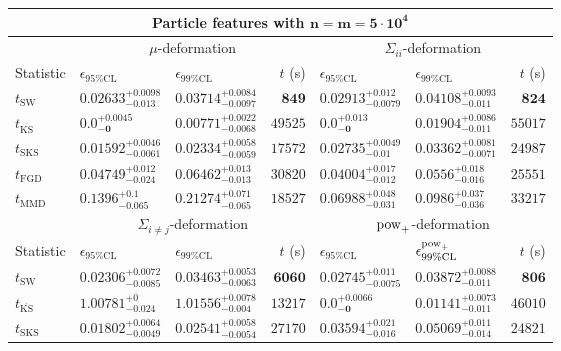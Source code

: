 \begin{tabular}{l|llr|llr}
	\toprule
	\multicolumn{7}{c}{{\bf Particle features with $\mathbf{n=m=5\cdot 10^{4}}$}} \\
	\toprule
	\multicolumn{1}{c}{} & \multicolumn{3}{c}{$\mu$-deformation} & \multicolumn{3}{c}{$\Sigma_{ii}$-deformation} \\
	Statistic & $\epsilon_{95\%\mathrm{CL}}$ & $\epsilon_{99\%\mathrm    {CL}}$ & $t$ (s) & $\epsilon_{95\%\mathrm{CL}}$ & $\epsilon_{99\%\mathrm{CL}}$ & $t$ (s) \\
	\midrule
	$t_{\mathrm{SW}}$ & $0.02633_{-0.013}^{+0.0098}$ & $0.03714_{-0.0097}^{+0.0084}$ & ${\mathbf{849}}$ & $0.02913_{-0.0079}^{+0.012}$ & $0.04108_{-0.011}^{+0.0093}$ & ${\mathbf{824}}$ \\
	$t_{\overline{\mathrm{KS}}}$ & ${\mathbf{0.0_{-0}^{+0.0045}}}$ & ${\mathbf{0.00771_{-0.0068}^{+0.0022}}}$ & $49525$ & ${\mathbf{0.0_{-0}^{+0.013}}}$ & ${\mathbf{0.01904_{-0.011}^{+0.0086}}}$ & $55017$ \\
	$t_{\mathrm{SKS}}$ & $0.01592_{-0.0061}^{+0.0046}$ & $0.02334_{-0.0059}^{+0.0058}$ & $17572$ & $0.02735_{-0.01}^{+0.0049}$ & $0.03362_{-0.0071}^{+0.0081}$ & $24987$ \\
	$t_{\mathrm{FGD}}$ & $0.04749_{-0.024}^{+0.012}$ & $0.06462_{-0.013}^{+0.013}$ & $30820$ & $0.04004_{-0.012}^{+0.017}$ & $0.0556_{-0.016}^{+0.018}$ & $25551$ \\
	$t_{\mathrm{MMD}}$ & $0.1396_{-0.065}^{+0.1}$ & $0.21274_{-0.065}^{+0.071}$ & $18527$ & $0.06988_{-0.031}^{+0.048}$ & $0.0986_{-0.036}^{+0.037}$ & $33217$ \\
	\toprule
	\multicolumn{1}{c}{} & \multicolumn{3}{c}{$\Sigma_{i\neq j}$-deformation} & \multicolumn{3}{c}{$\rm{pow}_{+}$-deformation} \\
	Statistic & $\epsilon_{95\%\mathrm{CL}}$ & $\epsilon_{99\%\mathrm{CL}}$ & $t$ (s) & $\epsilon_{95\%\mathrm{CL}}$ & $\epsilon^{\rm   {pow}_{+}}_{99\%\mathrm{CL}}$ & $t$ (s) \\
	\midrule
	$t_{\mathrm{SW}}$ & $0.02306_{-0.0085}^{+0.0072}$ & $0.03463_{-0.0063}^{+0.0053}$ & ${\mathbf{6060}}$ & $0.02745_{-0.0075}^{+0.011}$ & $0.03872_{-0.011}^{+0.0088}$ & ${\mathbf{806}}$ \\
	$t_{\overline{\mathrm{KS}}}$ & $1.00781_{-0.024}^{+0}$ & $1.01556_{-0.004}^{+0.0078}$ & $13217$ & ${\mathbf{0.0_{-0}^{+0.0066}}}$ & ${\mathbf{0.01141_{-0.011}^{+0.0073}}}$ & $46010$ \\
	$t_{\mathrm{SKS}}$ & $0.01802_{-0.0049}^{+0.0064}$ & $0.02541_{-0.0054}^{+0.0058}$ & $27170$ & $0.03594_{-0.016}^{+0.021}$ & $0.05069_{-0.014}^{+0.011}$ & $24821$ \\

\end{tabular}
